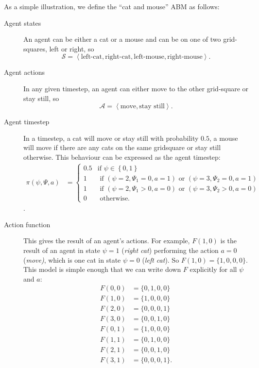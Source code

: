 \documentclass{article}
\begin{document}
As a simple illustration, we define the ``cat and mouse'' ABM as follows: 
\begin{description}
	\item[Agent states] An agent can be either a cat or a mouse and can be on one of two grid-squares, left or right, so 
	\[
	\mathcal{S} = \left<\textrm{left-cat}, \textrm{right-cat}, \textrm{left-mouse}, \textrm{right-mouse} \right>.
	\]

	\item[Agent actions] In any given timestep, an agent can either move to the other grid-square or stay still, so
	\[
	\mathcal{A} = \left<\textrm{move}, \textrm{stay still}\right>.
	\]
	
	\item[Agent timestep] In a timestep, a cat will move or stay still with probability $0.5$, a mouse will move if there are any cats on the same gridsquare or stay still otherwise. This behaviour can be expressed as the agent timestep:
	\[
	\begin{aligned}
	\pi(\psi, \Psi, a) &=
	\begin{cases}
	0.5 & \text{if } \psi \in \left\{0, 1\right\}\\  %
	1 & \text{ if }(\psi = 2, \Psi_1 = 0, a=1) \text{ or } (\psi=3, \Psi_2 = 0, a=1)\\
	1 & \text{ if } (\psi = 2, \Psi_1 > 0, a=0) \text{ or } (\psi=3, \Psi_2 > 0, a=0)\\
	0 & \text{ otherwise.}
	\end{cases}
	\end{aligned}
	\]
	 .

\item[Action function] This gives the result of an agent's actions. For example, $F(1,0)$ is the result of an agent in state $\psi=1$ (\textit{right cat}) performing the action $a=0$ (\textit{move)}, which is one cat in state $\psi=0$ (\textit{left cat}). So $F(1,0) = \{1,0,0,0\}$. This model is simple enough that we can write down $F$ explicitly for all $\psi$ and $a$:
\[
\begin{aligned}
F(0, 0) &= \{0,1,0,0\}\\
F(1, 0) &= \{1,0,0,0\}\\
F(2, 0) &= \{0,0,0,1\}\\
F(3, 0) &= \{0,0,1,0\}\\
F(0, 1) &= \{1,0,0,0\}\\
F(1, 1) &= \{0,1,0,0\}\\
F(2, 1) &= \{0,0,1,0\}\\
F(3, 1) &= \{0,0,0,1\}.\\
\end{aligned}
\]
\end{description}
\end{document}
